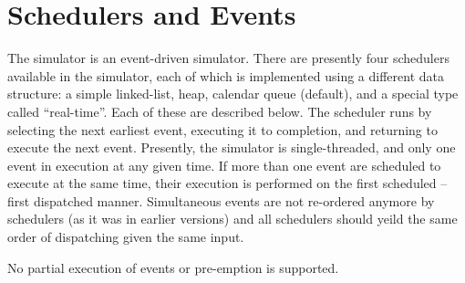 \section{Schedulers and Events}
\label{sec:sched}

The simulator is an event-driven simulator.
There are presently four schedulers available in the simulator, each
of which is implemented using a different data structure:
a simple linked-list, heap, calendar queue (default), and a special
type called ``real-time''.  Each of these are described below.
The scheduler runs by selecting the next earliest event, executing
it to completion, and returning to execute the next event.
Presently, the simulator is single-threaded, and only one event
in execution at any given time.
If more than one event are scheduled to execute at the same time,
their execution is performed on the first scheduled -- first
dispatched manner.  Simultaneous events are not re-ordered anymore by
schedulers (as it was in earlier versions) and all schedulers should
yeild the same order of dispatching given the same input.
 
No partial execution of events or pre-emption is supported.

